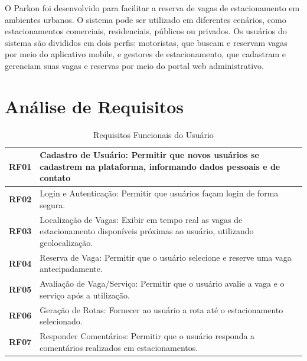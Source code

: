 O Parkon foi desenvolvido para facilitar a reserva de vagas de estacionamento em ambientes urbanos. O sistema pode ser utilizado em diferentes cenários, como estacionamentos comerciais, residenciais, públicos ou privados. Os usuários do sistema são divididos em dois perfis: motoristas, que buscam e reservam vagas por meio do aplicativo mobile, e gestores de estacionamento, que cadastram e gerenciam suas vagas e reservas por meio do portal web administrativo.


\section{Análise de Requisitos}
\label{sec:analise-requisitos}

\begin{table}[H]
\begin{center}
\caption{Requisitos Funcionais do Usuário}
\label{tab:requisitos-funcionais}
\begin{tabular}{|c|p{11cm}|}
\hline
\textbf{RF01} & Cadastro de Usuário: Permitir que novos usuários se cadastrem na plataforma, informando dados pessoais e de contato \\
\hline
\textbf{RF02} & Login e Autenticação: Permitir que usuários façam login de forma segura. \\
\hline
\textbf{RF03} & Localização de Vagas: Exibir em tempo real as vagas de estacionamento disponíveis próximas ao usuário, utilizando geolocalização. \\
\hline
\textbf{RF04} & Reserva de Vaga: Permitir que o usuário selecione e reserve uma vaga antecipadamente. \\
\hline
\textbf{RF05} & Avaliação de Vaga/Serviço: Permitir que o usuário avalie a vaga e o serviço após a utilização. \\
\hline
\textbf{RF06} & Geração de Rotas: Fornecer ao usuário a rota até o estacionamento selecionado. \\
\hline
\textbf{RF07} & Responder Comentários: Permitir que o usuário responda a comentários realizados em estacionamentos. \\
\hline
\end{tabular}
\end{center}
\end{table}

